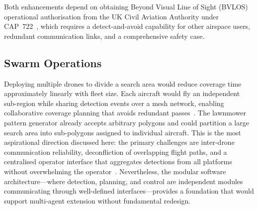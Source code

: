 Both enhancements depend on obtaining Beyond Visual Line of Sight (BVLOS) operational authorisation from the UK Civil Aviation Authority under CAP~722~\cite{cap722}, which requires a detect-and-avoid capability for other airspace users, redundant communication links, and a comprehensive safety case.

\subsection{Swarm Operations}\label{sec:future-swarm}

Deploying multiple drones to divide a search area would reduce coverage time approximately linearly with fleet size. Each aircraft would fly an independent sub-region while sharing detection events over a mesh network, enabling collaborative coverage planning that avoids redundant passes~\cite{waharte2010supporting}. The lawnmower pattern generator already accepts arbitrary polygons and could partition a large search area into sub-polygons assigned to individual aircraft. This is the most aspirational direction discussed here: the primary challenges are inter-drone communication reliability, deconfliction of overlapping flight paths, and a centralised operator interface that aggregates detections from all platforms without overwhelming the operator~\cite{multiuav}. Nevertheless, the modular software architecture---where detection, planning, and control are independent modules communicating through well-defined interfaces---provides a foundation that would support multi-agent extension without fundamental redesign.
